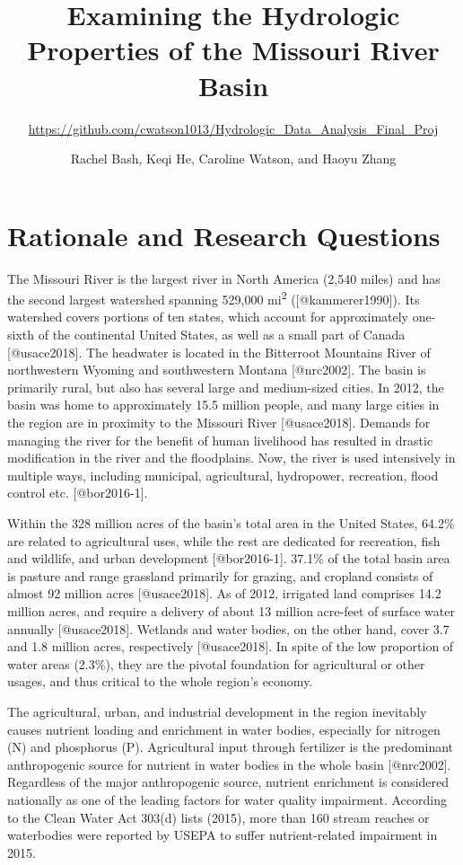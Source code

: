 \documentclass[12pt,]{article}
\title{Examining the Hydrologic Properties of the Missouri River Basin}
\subtitle{\url{https://github.com/cwatson1013/Hydrologic_Data_Analysis_Final_Proj}}
\author{Rachel Bash, Keqi He, Caroline Watson, and Haoyu Zhang}
\date{}
\begin{document}
\maketitle

\newpage

\hypertarget{rationale-and-research-questions}{%
\section{Rationale and Research
Questions}\label{rationale-and-research-questions}}

The Missouri River is the largest river in North America (2,540 miles)
and has the second largest watershed spanning 529,000
mi\textsuperscript{2} ({[}@kammerer1990{]}). Its watershed covers
portions of ten states, which account for approximately one-sixth of the
continental United States, as well as a small part of Canada
{[}@usace2018{]}. The headwater is located in the Bitterroot Mountains
River of northwestern Wyoming and southwestern Montana {[}@nrc2002{]}.
The basin is primarily rural, but also has several large and
medium-sized cities. In 2012, the basin was home to approximately 15.5
million people, and many large cities in the region are in proximity to
the Missouri River {[}@usace2018{]}. Demands for managing the river for
the benefit of human livelihood has resulted in drastic modification in
the river and the floodplains. Now, the river is used intensively in
multiple ways, including municipal, agricultural, hydropower,
recreation, flood control etc. {[}@bor2016-1{]}.

Within the 328 million acres of the basin's total area in the United
States, 64.2\% are related to agricultural uses, while the rest are
dedicated for recreation, fish and wildlife, and urban development
{[}@bor2016-1{]}. 37.1\% of the total basin area is pasture and range
grassland primarily for grazing, and cropland consists of almost 92
million acres {[}@usace2018{]}. As of 2012, irrigated land comprises
14.2 million acres, and require a delivery of about 13 million acre-feet
of surface water annually {[}@usace2018{]}. Wetlands and water bodies,
on the other hand, cover 3.7 and 1.8 million acres, respectively
{[}@usace2018{]}. In spite of the low proportion of water areas (2.3\%),
they are the pivotal foundation for agricultural or other usages, and
thus critical to the whole region's economy.

The agricultural, urban, and industrial development in the region
inevitably causes nutrient loading and enrichment in water bodies,
especially for nitrogen (N) and phosphorus (P). Agricultural input
through fertilizer is the predominant anthropogenic source for nutrient
in water bodies in the whole basin {[}@nrc2002{]}. Regardless of the
major anthropogenic source, nutrient enrichment is considered nationally
as one of the leading factors for water quality impairment. According to
the Clean Water Act 303(d) lists (2015), more than 160 stream reaches or
waterbodies were reported by USEPA to suffer nutrient-related impairment
in 2015.
\end{document}
